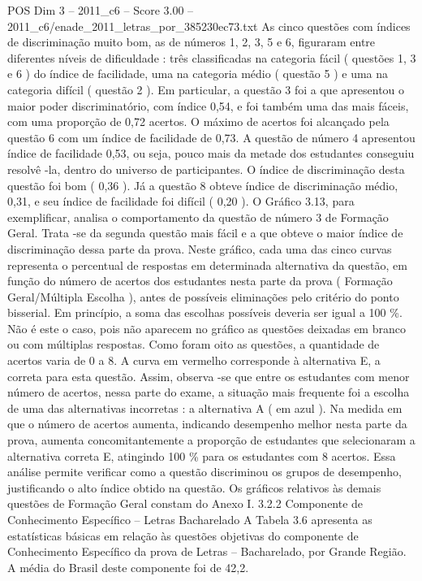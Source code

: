 \begin{textsample}{POS Dim 3 – 2011\_c6 – Score 3.00 – 2011\_c6/enade\_2011\_letras\_por\_385230ec73.txt}
As cinco questões com índices de discriminação muito bom, as de números 1, 2, 3, 5 e 6, figuraram entre diferentes níveis de dificuldade : três classificadas na categoria fácil ( questões 1, 3 e 6 ) do índice de facilidade, uma na categoria médio ( questão 5 ) e uma na categoria difícil ( questão 2 ).
Em particular, a questão 3 foi a que apresentou o maior poder discriminatório, com índice 0,54, e foi também uma das mais fáceis, com uma proporção de 0,72 acertos.
O máximo de acertos foi alcançado pela questão 6 com um índice de facilidade de 0,73.
A questão de número 4 apresentou índice de facilidade 0,53, ou seja, pouco mais da metade dos estudantes conseguiu resolvê -la, dentro do universo de participantes.
O índice de discriminação desta questão foi bom ( 0,36 ).
Já a questão 8 obteve índice de discriminação médio, 0,31, e seu índice de facilidade foi difícil ( 0,20 ).
O Gráfico 3.13, para exemplificar, analisa o comportamento da questão de número 3 de Formação Geral.
Trata -se da segunda questão mais fácil e a que obteve o maior índice de discriminação dessa parte da prova.
Neste gráfico, cada uma das cinco curvas representa o percentual de respostas em determinada alternativa da questão, em função do número de acertos dos estudantes nesta parte da prova ( Formação Geral/Múltipla Escolha ), antes de possíveis eliminações pelo critério do ponto bisserial.
Em princípio, a soma das escolhas possíveis deveria ser igual a 100 \%.
Não é este o caso, pois não aparecem no gráfico as questões deixadas em branco ou com múltiplas respostas.
Como foram oito as questões, a quantidade de acertos varia de 0 a 8.
A curva em vermelho corresponde à alternativa E, a correta para esta questão.
Assim, observa -se que entre os estudantes com menor número de acertos, nessa parte do exame, a situação mais frequente foi a escolha de uma das alternativas incorretas : a alternativa A ( em azul ).
Na medida em que o número de acertos aumenta, indicando desempenho melhor nesta parte da prova, aumenta concomitantemente a proporção de estudantes que selecionaram a alternativa correta E, atingindo 100 \% para os estudantes com 8 acertos.
Essa análise permite verificar como a questão discriminou os grupos de desempenho, justificando o alto índice obtido na questão.
Os gráficos relativos às demais questões de Formação Geral constam do Anexo I. 3.2.2 Componente de Conhecimento Específico – Letras Bacharelado A Tabela 3.6 apresenta as estatísticas básicas em relação às questões objetivas do componente de Conhecimento Específico da prova de Letras – Bacharelado, por Grande Região.
A média do Brasil deste componente foi de 42,2.

\end{textsample}

